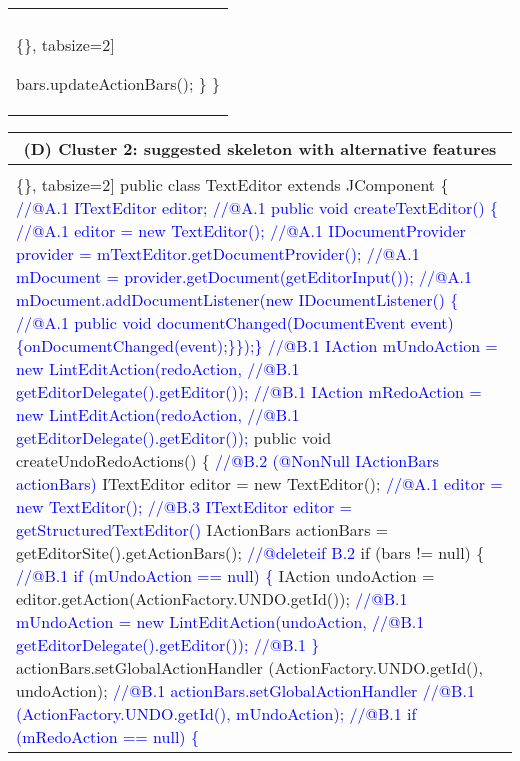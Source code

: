 \begin{figure*}[!htb]
\begin{minipage}{0.5\textwidth}
\begin{tabular}{@{}p{}}
\begin{Verbatim}[commandchars=\\\{\}, tabsize=2]
          
       bars.updateActionBars();
    \}  \}
   \end{Verbatim}
      \vspace{-4mm}
     \\   
\end{tabular} 
\end{minipage}
 \begin{minipage}{0.5\textwidth}
\scriptsize 
\begin{tabular}{@{}p{}} 
 \hline 
  \multicolumn{1}{c}{(D) Cluster 2: suggested skeleton with alternative features} \\ \hline
  \vspace{-4mm}
\begin{Verbatim}[commandchars=\\\{\}, tabsize=2]
public class TextEditor extends JComponent \{
\textcolor{blue}{//@A.1 ITextEditor editor;}
\textcolor{blue}{//@A.1 public void createTextEditor() \{}
\textcolor{blue}{//@A.1 editor = new TextEditor();}
\textcolor{blue}{//@A.1 IDocumentProvider provider = mTextEditor.getDocumentProvider(); }
\textcolor{blue}{//@A.1 mDocument = provider.getDocument(getEditorInput()); }
\textcolor{blue}{//@A.1 mDocument.addDocumentListener(new IDocumentListener() \{}
\textcolor{blue}{//@A.1 public void documentChanged(DocumentEvent event) \{onDocumentChanged(event);\}\});\}}
\textcolor{blue}{//@B.1 IAction mUndoAction = new LintEditAction(redoAction, }
\textcolor{blue}{//@B.1   getEditorDelegate().getEditor());}
\textcolor{blue}{//@B.1 IAction mRedoAction = new LintEditAction(redoAction, }
\textcolor{blue}{//@B.1   getEditorDelegate().getEditor());}
   public void createUndoRedoActions() \{  
\textcolor{blue}{//@B.2 (@NonNull IActionBars actionBars) }
     ITextEditor editor = new TextEditor(); 
\textcolor{blue}{//@A.1 editor = new TextEditor(); }
\textcolor{blue}{//@B.3 ITextEditor editor = getStructuredTextEditor()}
     IActionBars actionBars = getEditorSite().getActionBars(); \textcolor{blue}{//@deleteif B.2}
     if (bars != null) \{
\textcolor{blue}{//@B.1 if (mUndoAction == null) \{}
       IAction undoAction = editor.getAction(ActionFactory.UNDO.getId());
\textcolor{blue}{//@B.1 mUndoAction = new LintEditAction(undoAction, }
\textcolor{blue}{//@B.1 getEditorDelegate().getEditor());  }
\textcolor{blue}{//@B.1 \}          }
       actionBars.setGlobalActionHandler
          (ActionFactory.UNDO.getId(), undoAction);
\textcolor{blue}{ //@B.1 actionBars.setGlobalActionHandler}
\textcolor{blue}{//@B.1   (ActionFactory.UNDO.getId(), mUndoAction);}
\textcolor{blue}{//@B.1 if (mRedoAction == null) \{    }      

\end{Verbatim}
\end{tabular}
\end{minipage}
\end{figure*}
